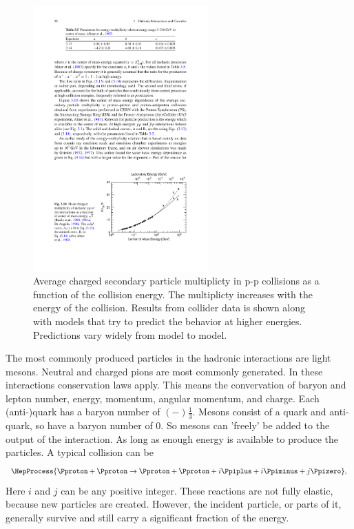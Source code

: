 \begin{figure}
    \centering
    \includegraphics[width=0.6\textwidth]
                    {plots/cosmic-rays/multiplicity}
    \caption{Average charged secondary particle multiplicty in p-p collisions as a function of the collision energy. The multiplicty increases with the energy of the collision. Results from collider data is shown along with models that try to predict the behavior at higher energies. Predictions vary widely from model to model.}
    \label{fig:multiplicity}
\end{figure}

The most commonly produced particles in the hadronic interactions are light mesons. Neutral and charged pions are most commonly generated. In these interactions conservation laws apply. This means the convervation of baryon and lepton number, energy, momentum, angular momentum, and charge. Each (anti-)quark has a baryon number of $(-)\frac{1}{3}$. Mesons consist of a quark and anti-quark, so have a baryon number of 0. So mesons can 'freely' be added to the output of the interaction. As long as enough energy is available to produce the particles. A typical collision can be
%
\begin{equation}
    \HepProcess{\Pproton + \Pproton \to \Pproton + \Pproton + i \Ppiplus + i \Ppiminus + j \Ppizero},
\end{equation}
%
Here $i$ and $j$ can be any positive integer. These reactions are not fully elastic, because new particles are created. However, the incident particle, or parts of it, generally survive and still carry a significant fraction of the energy.

